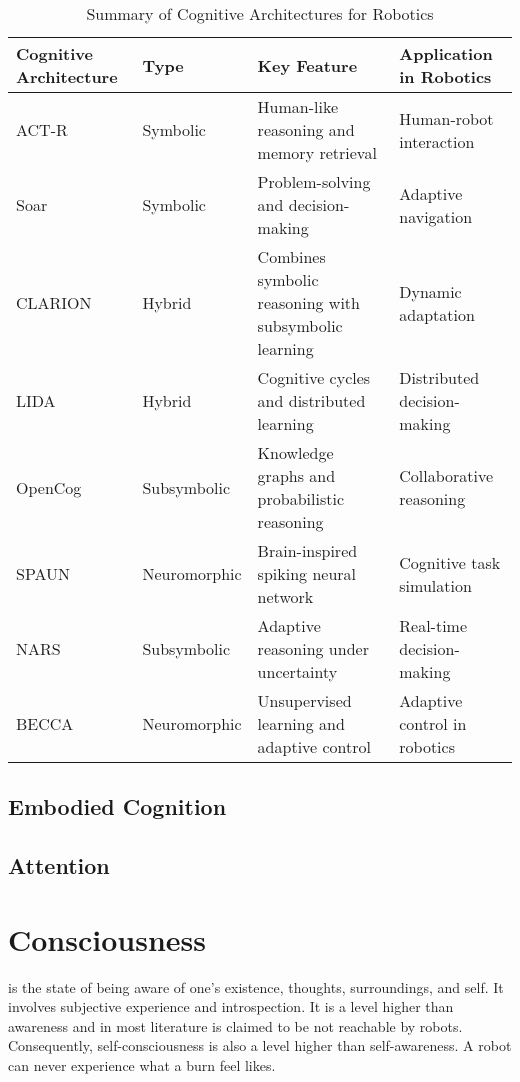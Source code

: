            \begin{table}[h!]
                \centering
                \begin{tabular}{|l|l|l|l|}
                    \hline
                    \textbf{Cognitive Architecture} & \textbf{Type} & \textbf{Key Feature} & \textbf{Application in Robotics} \\ \hline
                    ACT-R & Symbolic & Human-like reasoning and memory retrieval & Human-robot interaction  \\ \hline
                    Soar & Symbolic & Problem-solving and decision-making & Adaptive navigation  \\ \hline
                    CLARION & Hybrid & Combines symbolic reasoning with subsymbolic learning & Dynamic adaptation  \\ \hline
                    LIDA & Hybrid & Cognitive cycles and distributed learning & Distributed decision-making  \\ \hline
                    OpenCog & Subsymbolic & Knowledge graphs and probabilistic reasoning & Collaborative reasoning  \\ \hline
                    SPAUN & Neuromorphic & Brain-inspired spiking neural network & Cognitive task simulation  \\ \hline
                    NARS & Subsymbolic & Adaptive reasoning under uncertainty & Real-time decision-making  \\ \hline
                    BECCA & Neuromorphic & Unsupervised learning and adaptive control & Adaptive control in robotics  \\ \hline
                \end{tabular}
                \caption{Summary of Cognitive Architectures for Robotics}
            \end{table}




    \subsection{Embodied Cognition}

    \subsection{Attention}



\section{Consciousness} is the state of being aware of one’s existence, thoughts, surroundings, and self. It involves subjective experience and introspection. It is a level higher than awareness and in most literature is claimed to be not reachable by robots. Consequently, self-consciousness is also a level higher than self-awareness. A robot can never experience what a burn feel likes.
